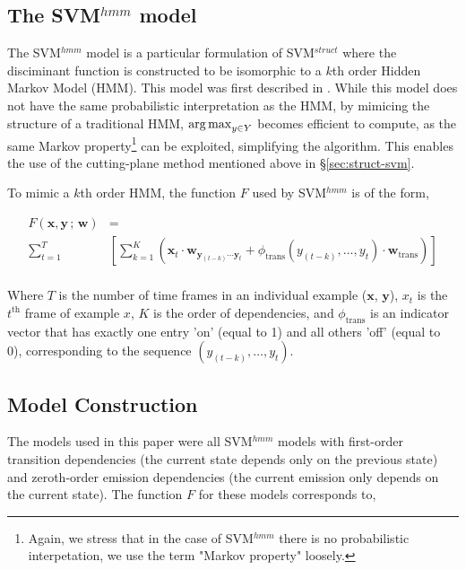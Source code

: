 \subsection{The SVM$^{hmm}$ model}

The SVM$^{hmm}$ model is a particular formulation of SVM$^{struct}$ where the
disciminant function is constructed to be isomorphic to a $k$th order Hidden
Markov Model (HMM). This model was first described in
\cite{Altun03hiddenmarkov}. While this model does not have the same
probabilistic interpretation as the HMM, by mimicing the structure of a
traditional HMM, $\operatorname*{arg\,max}_{y \in Y}$ becomes efficient to compute, as the same
Markov property\footnote{Again, we stress that in the case of SVM$^{hmm}$ there
is no probabilistic interpetation, we use the term "Markov property" loosely.}
can be exploited, simplifying the algorithm. This enables the use of the
cutting-plane method mentioned above in \S \ref{sec:struct-svm}.

To mimic a $k$th order HMM, the function $F$ used by SVM$^{hmm}$ is of the
form,

\begin{align*}
    F(\mathbf{x}, \mathbf{y}\,;\,\mathbf{w}) &=  \\
    \sum_{t=1}^{T}& \left[
      \sum_{k=1}^{K}\left(
        \mathbf{x}_{t} \cdot
        \mathbf{w}_{\mathbf{y}_{(t-k)} \dotsm \mathbf{y}_{t}} +
        \phi_{\text{trans}}(y_{(t-k)},\dots,y_{t}) \cdot
        \mathbf{w}_{\text{trans}}
      \right)
    \right] \\
\end{align*}

Where $T$ is the number of time frames in an individual example ($\mathbf{x}$,
$\mathbf{y}$), $x_t$ is the $t^{\text{th}}$ frame of example $x$, $K$ is the
order of dependencies, and $\phi_{\text{trans}}$ is an indicator vector that
has exactly one entry 'on' (equal to 1) and all others 'off' (equal to 0),
corresponding to the sequence $(y_{(t-k)},\dots,y_{t})$.

\subsection{Model Construction}

The models used in this paper were all SVM$^{hmm}$ models with first-order
transition dependencies (the current state depends only on the previous state)
and zeroth-order emission dependencies (the current emission only depends on
the current state). The function $F$ for these models corresponds to,

